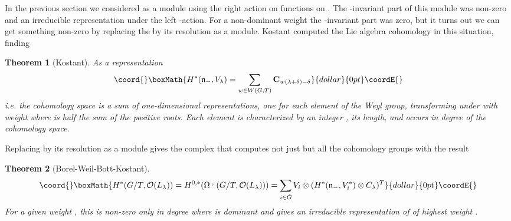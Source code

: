 \documentclass[a4paper,a4paper]{article}
\newtheorem{theorem}{Theorem}
\theoremstyle{conjecture}
\begin{document}
In the previous section we considered \coordHE{} as a \coordHE{}
module using the right \coordHE{} action on functions on \coordHE{}.  The
\coordHE{}-invariant part of this module was non-zero and an irreducible
representation \coordHE{} under the left \coordHE{}-action.  For a non-dominant
weight \myHighlight{$\lambda$}\coordHE{} the \coordHE{}-invariant part was zero, but it turns out
we can get something non-zero by replacing the  \coordHE{} by its
resolution as a \coordHE{} module.  Kostant computed the Lie algebra
cohomology in this situation, finding \cite{Kostant1}
\begin{theorem}[Kostant]

As a \coordHE{} representation
$$\coord{}\boxMath{H^*(\mathfrak n_-,V_\lambda)=\sum_{w\in W(G,T)} \mathbf C_{w(\lambda+\delta)-\delta}}{dollar}{0pt}\coordE{}$$
i.e. the cohomology space is a sum of one-dimensional \coordHE{} representations, one for each
element of the Weyl group, transforming under \coordHE{} with weight \coordHE{} where
\myHighlight{$\delta$}\coordHE{} is half the sum of the positive roots.  Each element \coordHE{} is characterized by
an integer \coordHE{}, its length, and \coordHE{} occurs in degree
\coordHE{} of the cohomology space.
\end{theorem}

Replacing  \coordHE{} by its resolution as a \coordHE{} module gives the
\myHighlight{$\bar\partial$}\coordHE{} complex \coordHE{} that computes not just
\coordHE{} but all the cohomology groups \coordHE{} with the
result

\begin{theorem}[Borel-Weil-Bott-Kostant]

$$\coord{}\boxMath{H^*(G/T, {\mathcal O}(L_\lambda))=H^{0,*}(\Omega^{\cdot,\cdot}(G/T,{\mathcal O}(L_\lambda)))
=\sum_{i\in \hat G}V_i\otimes (H^*({\mathfrak n_-},V_i^*)\otimes C_\lambda)^T}{dollar}{0pt}\coordE{}$$
For a given weight \myHighlight{$\lambda$}\coordHE{}, this is non-zero only in degree \coordHE{} where \coordHE{}
is dominant and gives an irreducible representation of \coordHE{} of highest weight \coordHE{}.
\end{theorem}
\end{document}

